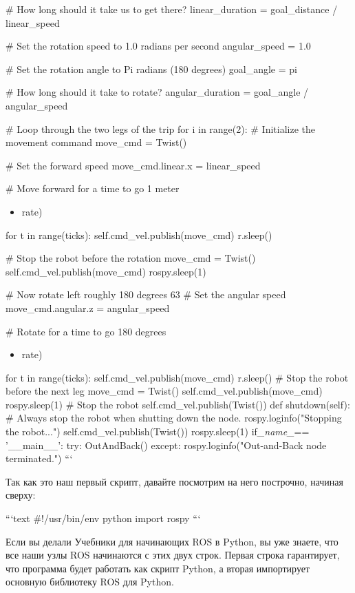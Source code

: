  # How long should it take us to get there?
 linear_duration = goal_distance / linear_speed

 # Set the rotation speed to 1.0 radians per second
 angular_speed = 1.0

 # Set the rotation angle to Pi radians (180 degrees)
 goal_angle = pi

 # How long should it take to rotate?
 angular_duration = goal_angle / angular_speed

 # Loop through the two legs of the trip
 for i in range(2):
 # Initialize the movement command
 move_cmd = Twist()

 # Set the forward speed
 move_cmd.linear.x = linear_speed

 # Move forward for a time to go 1 meter
\begin{itemize} 
 ticks = int(linear_duration \item { rate)} 
\end{itemize} 

 for t in range(ticks):
 self.cmd_vel.publish(move_cmd)
 r.sleep()

 # Stop the robot before the rotation
 move_cmd = Twist()
 self.cmd_vel.publish(move_cmd)
 rospy.sleep(1)

 # Now rotate left roughly 180 degrees 63
 # Set the angular speed
 move_cmd.angular.z = angular_speed

 # Rotate for a time to go 180 degrees
\begin{itemize} 
 ticks = int(goal_angle \item { rate)} 
\end{itemize} 
for t in range(ticks): self.cmd_vel.publish(move_cmd) r.sleep()
            # Stop the robot before the next leg
move_cmd = Twist() self.cmd_vel.publish(move_cmd) rospy.sleep(1)
        # Stop the robot
self.cmd_vel.publish(Twist())
def shutdown(self):
# Always stop the robot when shutting down the node. rospy.loginfo("Stopping the robot...") self.cmd_vel.publish(Twist())
rospy.sleep(1)
if\textit{_name_}== '__main__': try:
        OutAndBack()
    except:
rospy.loginfo("Out-and-Back node terminated.")
```

Так как это наш первый скрипт, давайте посмотрим на него построчно, начиная сверху:

```text
#!/usr/bin/env python 
import rospy
```

Если вы делали Учебники для начинающих ROS в Python, вы уже знаете, что все наши узлы ROS начинаются с этих двух строк. Первая строка гарантирует, что программа будет работать как скрипт Python, а вторая импортирует основную библиотеку ROS для Python.


